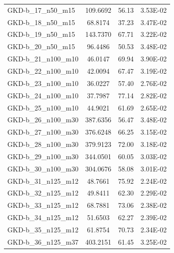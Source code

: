 \begin{table}[H]
\begin{tabular}{@{}lccc@{}}
GKD-b\_17\_n50\_m15  & 109.6692                      & 56.13         & 3.53E-02        \\
GKD-b\_18\_n50\_m15  & 68.8174                       & 37.23         & 3.47E-02        \\
GKD-b\_19\_n50\_m15  & 143.7370                      & 67.71         & 3.22E-02        \\
GKD-b\_20\_n50\_m15  & 96.4486                       & 50.53         & 3.48E-02        \\
GKD-b\_21\_n100\_m10 & 46.0147                       & 69.94         & 3.90E-02        \\
GKD-b\_22\_n100\_m10 & 42.0094                       & 67.47         & 3.19E-02        \\
GKD-b\_23\_n100\_m10 & 36.0227                       & 57.40         & 2.76E-02        \\
GKD-b\_24\_n100\_m10 & 37.7987                       & 77.14         & 2.82E-02        \\
GKD-b\_25\_n100\_m10 & 44.9021                       & 61.69         & 2.65E-02        \\
GKD-b\_26\_n100\_m30 & 387.6356                      & 56.47         & 3.48E-02        \\
GKD-b\_27\_n100\_m30 & 376.6248                      & 66.25         & 3.15E-02        \\
GKD-b\_28\_n100\_m30 & 379.9123                      & 72.00         & 3.18E-02        \\
GKD-b\_29\_n100\_m30 & 344.0501                      & 60.05         & 3.03E-02        \\
GKD-b\_30\_n100\_m30 & 304.0676                      & 58.08         & 3.01E-02        \\
GKD-b\_31\_n125\_m12 & 48.7661                       & 75.92         & 2.24E-02        \\
GKD-b\_32\_n125\_m12 & 49.8411                       & 62.30         & 2.29E-02        \\
GKD-b\_33\_n125\_m12 & 68.7881                       & 73.06         & 2.38E-02        \\
GKD-b\_34\_n125\_m12 & 51.6503                       & 62.27         & 2.39E-02        \\
GKD-b\_35\_n125\_m12 & 61.8754                       & 70.73         & 2.34E-02        \\
GKD-b\_36\_n125\_m37 & 403.2151                      & 61.45         & 3.25E-02        \\

\end{tabular}
\end{table}
